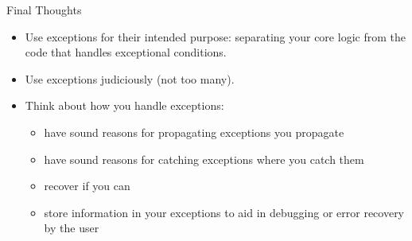 \documentclass{beamer}
\begin{document}
\begin{frame}[fragile]{Final Thoughts}

\begin{itemize}
\item Use exceptions for their intended purpose: separating your core logic from the code that handles exceptional conditions.
\item Use exceptions judiciously (not too many).
\item Think about how you handle exceptions:
\begin{itemize}
\item have sound reasons for propagating exceptions you propagate
\item have sound reasons for catching exceptions where you catch them
\item recover if you can
\item store information in your exceptions to aid in debugging or error recovery by the user
\end{itemize}
\end{itemize}


\end{frame}







\end{document}
